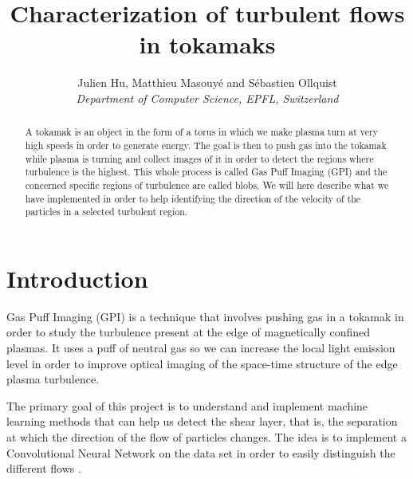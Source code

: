 \documentclass[10pt,conference,compsocconf]{IEEEtran}
\begin{document}
\title{Characterization of turbulent flows in tokamaks}

\author{
  Julien Hu, Matthieu Masouyé and Sébastien Ollquist\\
  \textit{Department of Computer Science, EPFL, Switzerland}
}

\maketitle

\begin{abstract}
  A tokamak is an object in the form of a torus in which we make plasma turn at very high speeds in order to generate energy. The goal is then to push gas into the tokamak while plasma is turning and collect images of it in order to detect the regions where turbulence is the highest. This whole process is called Gas Puff Imaging (GPI) and the concerned specific regions of turbulence are called blobs. We will here describe what we have implemented in order to help identifying the direction of the velocity of the particles in a selected turbulent region.
\end{abstract}

\section{Introduction}
Gas Puff Imaging (GPI) is a technique that involves pushing gas in a tokamak in order to study the turbulence present at the edge of magnetically confined plasmas. It uses a puff of neutral gas so we can increase the local light emission level in order to improve optical imaging of the space-time structure of the edge plasma turbulence.\par
The primary goal of this project is to understand and implement machine learning methods that can help us detect the shear layer, that is, the separation at which the direction of the flow of particles changes. The idea is to implement a Convolutional Neural Network on the data set in order to easily distinguish the different flows \cite{velocitycnn}.
\end{document}
